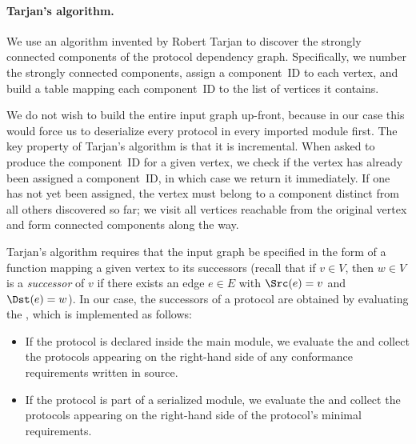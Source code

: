 \documentclass[../generics]{subfiles}
\begin{document}
\paragraph{Tarjan's algorithm.} We use an algorithm invented by Robert Tarjan \cite{tarjan} to discover the strongly connected components of the protocol dependency graph. Specifically, we number the strongly connected components, assign a component~ID to each vertex, and build a table mapping each component~ID to the list of vertices it contains.

We do not wish to build the entire input graph up-front, because in our case this would force us to deserialize every protocol in every imported module first. The key property of Tarjan's algorithm is that it is incremental. When asked to produce the component~ID for a given vertex, we check if the vertex has already been assigned a component~ID, in which case we return it immediately. If one has not yet been assigned, the vertex must belong to a component distinct from all others discovered so far; we visit all vertices reachable from the original vertex and form connected components along the way.

Tarjan's algorithm requires that the input graph be specified in the form of a function mapping a given vertex to its successors (recall that if $v\in V$, then $w\in V$ is a \emph{successor} of $v$ if there exists an edge $e\in E$ with $\Src(e)=v$ and $\Dst(e)=w$). In our case, the successors of a protocol are obtained by evaluating the , which is implemented as follows:
\begin{itemize}
\item If the protocol is declared inside the main module, we evaluate the  and collect the protocols appearing on the right-hand side of any conformance requirements written in source.

\item If the protocol is part of a serialized module, we evaluate the  and collect the protocols appearing on the right-hand side of the protocol's minimal requirements.
\end{itemize}
\end{document}
